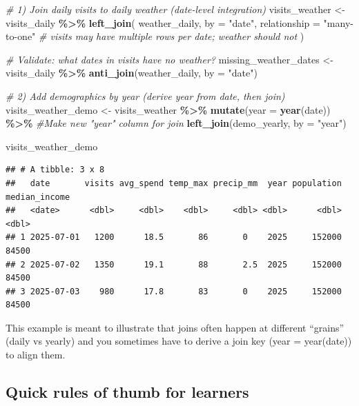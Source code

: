 \documentclass[
  11pt,
]{article}
\newenvironment{Shaded}{\begin{snugshade}}{\end{snugshade}}
\newcommand{\AttributeTok}[1]{\textcolor[rgb]{0.13,0.29,0.53}{#1}}
\newcommand{\CommentTok}[1]{\textcolor[rgb]{0.56,0.35,0.01}{\textit{#1}}}
\newcommand{\FunctionTok}[1]{\textcolor[rgb]{0.13,0.29,0.53}{\textbf{#1}}}
\newcommand{\NormalTok}[1]{#1}
\newcommand{\OtherTok}[1]{\textcolor[rgb]{0.56,0.35,0.01}{#1}}
\newcommand{\SpecialCharTok}[1]{\textcolor[rgb]{0.81,0.36,0.00}{\textbf{#1}}}
\newcommand{\StringTok}[1]{\textcolor[rgb]{0.31,0.60,0.02}{#1}}
\begin{document}
\begin{Shaded}
\begin{Highlighting}[]
\CommentTok{\# 1) Join daily visits to daily weather (date{-}level integration)}
\NormalTok{visits\_weather }\OtherTok{\textless{}{-}}\NormalTok{ visits\_daily }\SpecialCharTok{\%\textgreater{}\%}
  \FunctionTok{left\_join}\NormalTok{(}
\NormalTok{    weather\_daily,}
    \AttributeTok{by =} \StringTok{"date"}\NormalTok{,}
    \AttributeTok{relationship =} \StringTok{"many{-}to{-}one"}  \CommentTok{\# visits may have multiple rows per date; weather should not}
\NormalTok{  )}

\CommentTok{\# Validate: what dates in visits have no weather?}
\NormalTok{missing\_weather\_dates }\OtherTok{\textless{}{-}}\NormalTok{ visits\_daily }\SpecialCharTok{\%\textgreater{}\%}
  \FunctionTok{anti\_join}\NormalTok{(weather\_daily, }\AttributeTok{by =} \StringTok{"date"}\NormalTok{)}

\CommentTok{\# 2) Add demographics by year (derive year from date, then join)}
\NormalTok{visits\_weather\_demo }\OtherTok{\textless{}{-}}\NormalTok{ visits\_weather }\SpecialCharTok{\%\textgreater{}\%}
  \FunctionTok{mutate}\NormalTok{(}\AttributeTok{year =} \FunctionTok{year}\NormalTok{(date)) }\SpecialCharTok{\%\textgreater{}\%} \CommentTok{\#Make new "year" column for join}
  \FunctionTok{left\_join}\NormalTok{(demo\_yearly, }\AttributeTok{by =} \StringTok{"year"}\NormalTok{)}

\NormalTok{visits\_weather\_demo}
\end{Highlighting}
\end{Shaded}

\begin{verbatim}
## # A tibble: 3 x 8
##   date       visits avg_spend temp_max precip_mm  year population median_income
##   <date>      <dbl>     <dbl>    <dbl>     <dbl> <dbl>      <dbl>         <dbl>
## 1 2025-07-01   1200      18.5       86       0    2025     152000         84500
## 2 2025-07-02   1350      19.1       88       2.5  2025     152000         84500
## 3 2025-07-03    980      17.8       83       0    2025     152000         84500
\end{verbatim}

This example is meant to illustrate that joins often happen at different
``grains'' (daily vs yearly) and you sometimes have to derive a join key
(year = year(date)) to align them.

\subsection{Quick rules of thumb for
learners}\label{quick-rules-of-thumb-for-learners}
\end{document}
